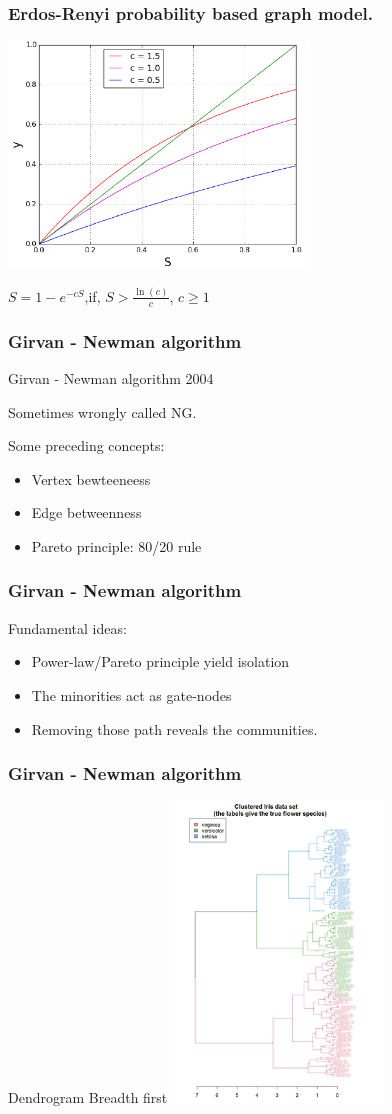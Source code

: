 \documentclass[professionalfonts]{beamer}
\begin{document}
\begin{frame}
\frametitle{Erdos-Renyi probability based graph model.}
\includegraphics[height=6cm]{s_prob}

$S = 1-e^{-cS}$,if, $S>\frac{\ln(c)}{c}$,  $c\geq 1$
\end{frame}


\begin{frame}
\frametitle{Girvan - Newman algorithm}
Girvan - Newman algorithm 2004

Sometimes wrongly called NG.

Some preceding concepts:
\begin{itemize}
\item Vertex bewteeneess
\item Edge betweenness
\item Pareto principle: 80/20 rule
\end{itemize}
\end{frame}


\begin{frame}
\frametitle{Girvan - Newman algorithm}
Fundamental ideas:
\begin{itemize}
\item Power-law/Pareto principle yield isolation 
\item The minorities act as gate-nodes
\item Removing those path reveals the communities.
\end{itemize}
\end{frame}


\begin{frame}
\frametitle{Girvan - Newman algorithm}
Dendrogram Breadth first
\includegraphics[height=8cm]{dendrogram}
\end{frame}
\end{document}
